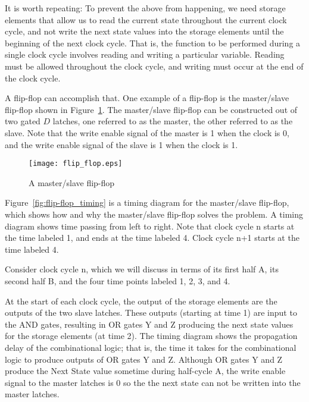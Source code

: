 \documentclass{patt}
\begin{document}
It is worth repeating: To prevent the above from happening, we need storage 
elements that allow us to read the current state throughout the current clock
cycle, and not write the next state values into the storage elements until 
the beginning of the next clock cycle.  That is, the function to be performed
during a single clock cycle involves reading and writing a particular variable.
\lightbulb[-18pt]
Reading must be allowed throughout the clock cycle, and writing must occur at
the end of the clock cycle.

A flip-flop can accomplish that.  One example of a flip-flop is the master/slave
flip-flop shown in Figure~\ref{fig:flip-flop}.  The master/slave flip-flop 
can be constructed out of two gated $D$ latches, one referred to as the master,
the other referred to as the slave.  Note that the write enable signal of the 
master is 1 when the clock is 0, and the write enable signal of the slave is 1
when the clock is 1.

\begin{figure}
\centerline{\texttt{[image: flip\_flop.eps]}}
\caption{A master/slave flip-flop}
\label{fig:flip-flop}
\vspace{12pt}
\end{figure}

Figure~\ref{fig:flip-flop_timing} is a timing diagram for the master/slave
flip-flop, which shows how and why the master/slave flip-flop solves 
the problem.  A timing diagram shows time passing from left to right.
Note that clock cycle n starts at the time labeled 1, and ends at the time
labeled 4.  Clock cycle n+1 starts at the time labeled 4.

Consider clock cycle n, which we will discuss in terms of its first half A,
its second half B, and the four time points labeled 1, 2, 3, and 4.  

At the start of each clock cycle, the output of the storage elements are the 
outputs of the two slave latches.  These outputs (starting at time 1) 
are input to the AND gates, resulting in OR gates Y and Z producing the next 
state values for the storage elements (at time 2).  The timing diagram shows the
propagation delay of the combinational logic; that is, the time it takes for 
the combinational logic to produce outputs of OR gates Y and Z.  Although OR 
gates Y and Z produce the Next State value sometime during half-cycle A, 
the write enable signal to the master latches is 0 so the the next state 
can not be written into the master latches.  
\end{document}
